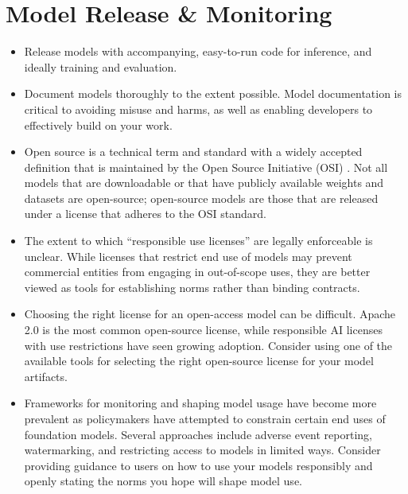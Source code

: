 \section{Model Release \& Monitoring}
\label{sec:model-release}
\vspace{-2mm}

\begin{tcolorbox}[
    width=\textwidth,
    title={Model Release \& Monitoring Best Practices},
    colback=backgroundcol, %
    colframe=darkgray, %
    colbacktitle=dataprep, %
    coltitle=white, %
    coltext=black %
]

\begin{itemize}[itemsep=0pt, wide=3pt]
    \item Release models with accompanying, easy-to-run code for inference, and ideally training and evaluation.
    \item Document models thoroughly to the extent possible. Model documentation is critical to avoiding misuse and harms, as well as enabling developers to effectively build on your work.
    \item Open source is a technical term and standard with a widely accepted definition that is maintained by the Open Source Initiative (OSI) \citep{OSI2024def}. Not all models that are downloadable or that have publicly available weights and datasets are open-source; open-source models are those that are released under a license that adheres to the OSI standard. 
    \item The extent to which ``responsible use licenses'' are legally enforceable is unclear. While licenses that restrict end use of models may prevent commercial entities from engaging in out-of-scope uses, they are better viewed as tools for establishing norms rather than binding contracts.
    \item Choosing the right license for an open-access model can be difficult. Apache 2.0 is the most common open-source license, while responsible AI licenses with use restrictions have seen growing adoption. Consider using one of the available tools for selecting the right open-source license for your model artifacts.
    \item Frameworks for monitoring and shaping model usage have become more prevalent as policymakers have attempted to constrain certain end uses of foundation models. Several approaches include adverse event reporting, watermarking, and restricting access to models in limited ways. Consider providing guidance to users on how to use your models responsibly and openly stating the norms you hope will shape model use.
\end{itemize}
\end{tcolorbox}

